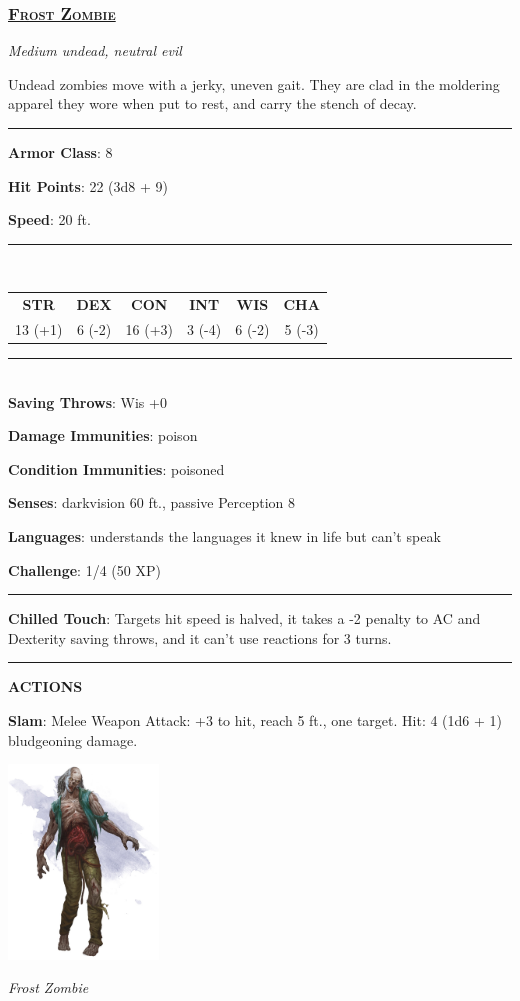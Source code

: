 \subsubsection*{\underline{\textsc{\Large Frost Zombie}}}
\noindent\emph{Medium undead, neutral evil}

Undead zombies move with a jerky, uneven gait. They are clad in the moldering apparel they wore when put to rest, and carry the stench of decay.

\noindent\rule{0.5\textwidth}{0.5pt}

\noindent\textbf{Armor Class}: 8

\noindent\textbf{Hit Points}: 22 (3d8 + 9)

\noindent\textbf{Speed}: 20 ft.

\noindent\rule{0.5\textwidth}{0.5pt} \\
\begin{table}[H]
	\begin{tabular}{cccccc}
		\textbf{STR} & \textbf{DEX} & \textbf{CON} & \textbf{INT} & \textbf{WIS} & \textbf{CHA} \\
		13 (+1) & 6 (-2) & 16 (+3) & 3 (-4) & 6 (-2) & 5 (-3) \\
	\end{tabular}
\end{table}
\noindent\rule{0.5\textwidth}{0.5pt} \\

\noindent\textbf{Saving Throws}: Wis +0

\noindent\textbf{Damage Immunities}: poison

\noindent\textbf{Condition Immunities}: poisoned

\noindent\textbf{Senses}: darkvision 60 ft., passive Perception 8

\noindent\textbf{Languages}: understands the languages it knew in life but can't speak

\noindent\textbf{Challenge}: 1/4 (50 XP)

\noindent\rule{0.5\textwidth}{0.5pt}

\noindent\textbf{Chilled Touch}: Targets hit speed is halved, it takes a -2 penalty to AC and Dexterity saving throws, and it can't use reactions for 3 turns.

\noindent\rule{0.5\textwidth}{0.5pt}

\noindent\textbf{ACTIONS}

\noindent\textbf{Slam}: Melee Weapon Attack: +3 to hit, reach 5 ft., one target. Hit: 4 (1d6 + 1) bludgeoning damage.

\begin{center}
	\includegraphics[width = 0.3\textwidth]{zombie}
	
	\emph{Frost Zombie}
\end{center}